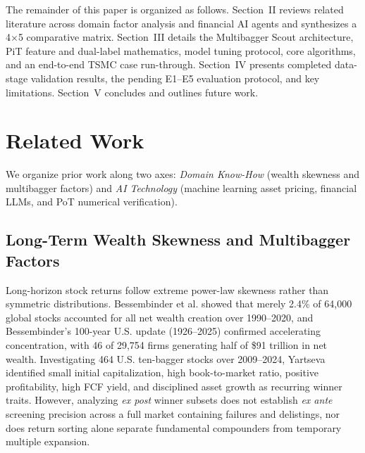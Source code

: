 \documentclass[conference]{IEEEtran}
\begin{document}
The remainder of this paper is organized as follows. Section~II reviews related literature across domain factor analysis and financial AI agents and synthesizes a 4$\times$5 comparative matrix. Section~III details the Multibagger Scout architecture, PiT feature and dual-label mathematics, model tuning protocol, core algorithms, and an end-to-end TSMC case run-through. Section~IV presents completed data-stage validation results, the pending E1--E5 evaluation protocol, and key limitations. Section~V concludes and outlines future work.

\section{Related Work}

We organize prior work along two axes: \emph{Domain Know-How} (wealth skewness and multibagger factors) and \emph{AI Technology} (machine learning asset pricing, financial LLMs, and PoT numerical verification).

\subsection{Long-Term Wealth Skewness and Multibagger Factors}
Long-horizon stock returns follow extreme power-law skewness rather than symmetric distributions. Bessembinder et al. \cite{bessembinder2023} showed that merely 2.4\% of 64,000 global stocks accounted for all net wealth creation over 1990--2020, and Bessembinder's 100-year U.S. update (1926--2025) \cite{bessembinder2026} confirmed accelerating concentration, with 46 of 29,754 firms generating half of \$91 trillion in net wealth. Investigating 464 U.S. ten-bagger stocks over 2009--2024, Yartseva \cite{yartseva2025} identified small initial capitalization, high book-to-market ratio, positive profitability, high FCF yield, and disciplined asset growth as recurring winner traits. However, analyzing \emph{ex post} winner subsets does not establish \emph{ex ante} screening precision across a full market containing failures and delistings, nor does return sorting alone separate fundamental compounders from temporary multiple expansion.
\end{document}

